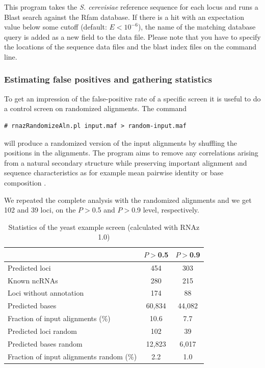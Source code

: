 \documentclass[11pt]{article}
\begin{document}
This program takes the \emph{S. cerevisiae} reference sequence for each
locus and runs a Blast search against the Rfam database.  If there is a hit
with an expectation value below some cutoff (default: $E<10^{-6}$), the
name of the matching database query is added as a new field to the data
file. Please note that you have to specify the locations of the sequence
data files and the blast index files on the command line.


\subsubsection{Estimating false positives and gathering statistics}
\label{sec:estim-false-posit-1}

To get an impression of the false-positive rate of a specific screen it is
useful to do a control screen on randomized alignments. The command

\begin{verbatim}
# rnazRandomizeAln.pl input.maf > random-input.maf
\end{verbatim}

will produce a randomized version of the input alignments by shuffling the
positions in the alignments. The program aims to remove any correlations
arising from a natural secondary structure while preserving important
alignment and sequence characteristics as for example mean pairwise
identity or base composition \cite{washietl04}.

We repeated the complete analysis with the randomized alignments and we get
102 and 39 loci, on the $P>$0.5 and $P>$0.9 level, respectively. 

\begin{table}
  \caption{Statistics of the yeast example screen (calculated with RNAz 1.0)}

  \begin{center}
    \begin{tabular}{lcc}\toprule
      & $P>$0.5 & $P>$0.9\\
      \midrule
    Predicted loci & 454 & 303\\
    Known ncRNAs & 280 & 215\\
    Loci without annotation & 174 & 88\\
    Predicted bases & 60,834 & 44,082\\
    Fraction of input alignments (\%) & 10.6 & 7.7\\
    Predicted loci random & 102 & 39\\
    Predicted bases random& 12,823 & 6,017\\
    Fraction of input alignments random (\%) & 2.2 & 1.0\\
    \bottomrule
  \end{tabular}
\end{center}
\label{tab:statistics}
\end{table}
\end{document}

